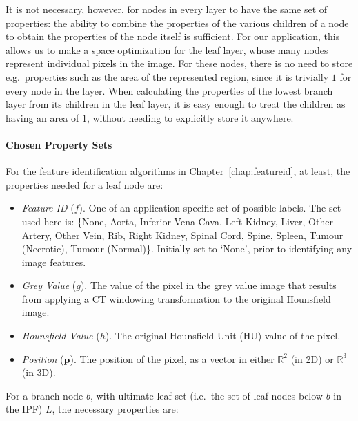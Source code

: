 It is not necessary, however, for nodes in every layer to have the same set of properties: the ability to combine the properties of the various children of a node to obtain the properties of the node itself is sufficient. For our application, this allows us to make a space optimization for the leaf layer, whose many nodes represent individual pixels in the image. For these nodes, there is no need to store e.g.~properties such as the area of the represented region, since it is trivially $1$ for every node in the layer. When calculating the properties of the lowest branch layer from its children in the leaf layer, it is easy enough to treat the children as having an area of $1$, without needing to explicitly store it anywhere.

\paragraph{Chosen Property Sets}

For the feature identification algorithms in Chapter~\ref{chap:featureid}, at least, the properties needed for a leaf node are:

\begin{itemize}

\item \emph{Feature ID} ($f$). One of an application-specific set of possible labels. The set used here is: \{None, Aorta, Inferior Vena Cava, Left Kidney, Liver, Other Artery, Other Vein, Rib, Right Kidney, Spinal Cord, Spine, Spleen, Tumour (Necrotic), Tumour (Normal)\}. Initially set to `None', prior to identifying any image features.

\item \emph{Grey Value} ($g$). The value of the pixel in the grey value image that results from applying a CT windowing transformation to the original Hounsfield image.

\item \emph{Hounsfield Value} ($h$). The original Hounsfield Unit (HU) value of the pixel.

\item \emph{Position} ($\mathbf{p}$). The position of the pixel, as a vector in either $\mathbb{R}^2$ (in 2D) or $\mathbb{R}^3$ (in 3D).

\end{itemize}

\noindent For a branch node $b$, with ultimate leaf set (i.e.~the set of leaf nodes below $b$ in the IPF) $L$, the necessary properties are:

